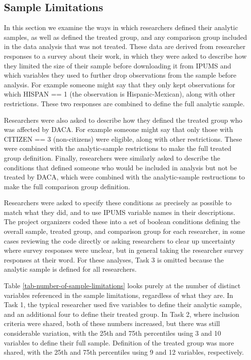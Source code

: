 \documentclass[
  letterpaper,
  DIV=11,
  numbers=noendperiod]{scrartcl}
\begin{document}
\hypertarget{sec-sample-limitations}{%
\subsection{Sample Limitations}\label{sec-sample-limitations}}

In this section we examine the ways in which researchers defined their
analytic samples, as well as defined the treated group, and any
comparison group included in the data analysis that was not treated.
These data are derived from researcher responses to a survey about their
work, in which they were asked to describe how they limited the size of
their sample before downloading it from IPUMS and which variables they
used to further drop observations from the sample before analysis. For
example someone might say that they only kept observations for which
HISPAN == 1 (the observation is Hispanic-Mexican), along with other
restrictions. These two responses are combined to define the full
analytic sample.

Researchers were also asked to describe how they defined the treated
group who was affected by DACA. For example someone might say that only
those with CITIZEN == 3 (non-citizens) were eligible, along with other
restrictions. These were combined with the analytic-sample restrictions
to make the full treated group definition. Finally, researchers were
similarly asked to describe the conditions that defined someone who
would be included in analysis but not be treated by DACA, which were
combined with the analytic-sample restructions to make the full
comparison group definition.

Researchers were asked to specify these conditions as precisely as
possible to match what they did, and to use IPUMS variable names in
their descriptions. The project organizers coded these into a set of
boolean conditions defining the overall sample, treated group, and
comparison group for each researcher, in some cases reviewing the code
directly or asking researchers to clear up uncertainty where survey
responses were unclear, but in general taking the researcher survey
responses at their word. For these analyses, Task 3 is omitted because
the analytic sample is defined for all researchers.

Table \ref{tab-number-of-sample-limitations} looks purely at the number
of distinct variables referenced in the sample limitations, regardless
of what they are. In Task 1, the typical researcher used five variables
to define their analytic sample, and an additional four to define their
treated group. In Task 2, where inclusion criteria were shared, both of
these numbers increased, but there was still considerable variation,
with the 25th and 75th percentiles using 3 and 10 variables to define
their full sample. Definition of the treated group was more shared, with
the 25th and 75th percentiles using 9 and 12 variables, respectively.
\end{document}
